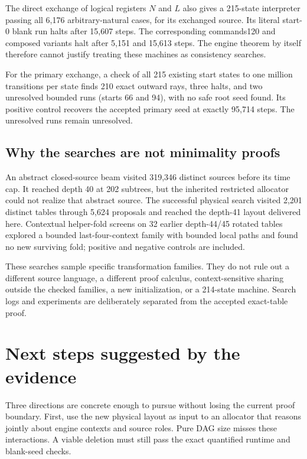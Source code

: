 \documentclass[11pt]{article}
\begin{document}
The direct exchange of logical registers $N$ and $L$ also gives a
215-state interpreter passing all 6,176 arbitrary-natural cases, for
its exchanged source. Its literal start-0 blank run halts after 15,607
steps. The corresponding commands120 and composed variants halt after
5,151 and 15,613 steps. The engine theorem by itself therefore cannot
justify treating these machines as consistency searches.

For the primary exchange, a check of all 215 existing start states to
one million transitions per state finds 210 exact outward rays, three
halts, and two unresolved bounded runs (starts 66 and 94), with no safe
root seed found. Its positive control recovers the accepted primary
seed at exactly 95,714 steps. The unresolved runs remain unresolved.

\subsection{Why the searches are not minimality proofs}

An abstract closed-source beam visited 319,346 distinct sources before
its time cap. It reached depth 40 at 202 subtrees, but the inherited
restricted allocator could not realize that abstract source. The
successful physical search visited 2,201 distinct tables through 5,624
proposals and reached the depth-41 layout delivered here. Contextual
helper-fold screens on 32 earlier depth-44/45 rotated tables explored a
bounded last-four-context family with bounded local paths and found no new
surviving fold; positive and negative controls are included.

These searches sample specific transformation families. They do not
rule out a different source language, a different proof calculus,
context-sensitive sharing outside the checked families, a new
initialization, or a 214-state machine. Search logs and experiments
are deliberately separated from the accepted exact-table proof.

\section{Next steps suggested by the evidence}

Three directions are concrete enough to pursue without losing the
current proof boundary. First, use the new physical layout as input
to an allocator that reasons jointly about engine contexts and source
roles. Pure DAG size misses these interactions. A viable deletion must
still pass the exact quantified runtime and blank-seed checks.
\end{document}
